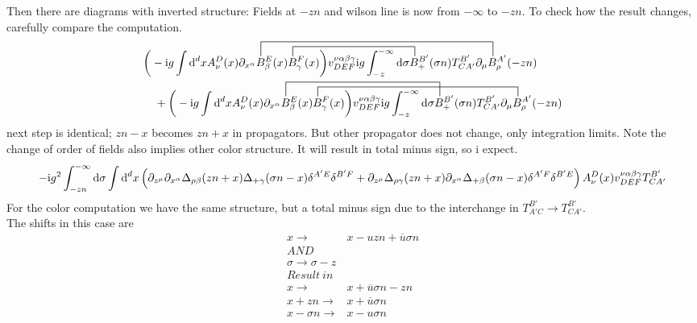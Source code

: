 Then there are diagrams with inverted structure: Fields at $-zn$ and wilson line is now from $-\infty$ to $-zn$. 
To check how the result changes, carefully compare the computation. 
\begin{align}
	&\contraction[3ex]{\bigg(-\imag g \int \ddx xA_\nu^D(x) \partial_{x^\alpha}}{B}{_\beta^{E} (x) B_\gamma^F(x) \bigg) v^{\nu \alpha\beta\gamma}_{DEF}\imag g \int_{-z}^{-\infty} \dx \sigma B_+^{B'}(\sigma n) T^{B'}_{CA'}\partial_\mu}{B}
	\contraction[2ex]{\bigg(-\imag g \int \ddx xA_\nu^D(x) \partial_{x^\alpha} B_\beta^{E} (x) }{B}{_\gamma^F(x) \bigg) v^{\nu \alpha\beta\gamma}_{DEF}\imag g \int_{-z}^{-\infty} \dx \sigma }{B}
	\bigg(-\imag g \int \ddx xA_\nu^D(x) \partial_{x^\alpha} B_\beta^{E} (x) B_\gamma^F(x) \bigg) v^{\nu \alpha\beta\gamma}_{DEF}\imag g \int_{-z}^{-\infty} \dx \sigma B_+^{B'}(\sigma n) T^{B'}_{CA'}\partial_\mu B^{A'}_\rho (-zn) 
	\nl
	+
	\contraction[3ex]{\bigg(-\imag g \int \ddx xA_\nu^D(x) \partial_{x^\alpha}}{B}{_\beta^{E} (x) B_\gamma^F(x) \bigg) v^{\nu \alpha\beta\gamma}_{DEF}\imag g \int_{-z}^{-\infty} \dx \sigma}{B}
	\contraction[2ex]{\bigg(-\imag g \int \ddx xA_\nu^D(x) \partial_{x^\alpha} B_\beta^{E} (x)}{B}{_\gamma^F(x) \bigg) v^{\nu \alpha\beta\gamma}_{DEF}\imag g \int_{-z}^{-\infty} \dx \sigma B_+^{B'}(\sigma n) T^{B'}_{CA'}\partial_\mu}{B}
	\bigg(-\imag g \int \ddx xA_\nu^D(x) \partial_{x^\alpha} B_\beta^{E} (x) B_\gamma^F(x) \bigg) v^{\nu \alpha\beta\gamma}_{DEF}\imag g \int_{-z}^{-\infty} \dx \sigma B_+^{B'}(\sigma n) T^{B'}_{CA'}\partial_\mu B^{A'}_\rho (-zn)
\end{align}
next step is identical; $zn-x$ becomes $zn+x$ in propagators. But other propagator does not change, only integration limits. Note the change of order of fields also implies other color structure. It will result in total minus sign, so i expect.
\begin{align}
-\text{i} g^2\int_{-zn}^{-\infty} \text{d} \sigma  \int \text{d} ^d x 
\left( \partial_{z^\mu} \partial_{x^\alpha} \Delta_{\rho \beta}(zn+x) \Delta_{+ \gamma}(\sigma n -x)\delta^{A'E} \delta^{B'F} + \partial_{z^\mu}  \Delta_{\rho \gamma}(zn+x) \partial_{x^\alpha}\Delta_{+ \beta}(\sigma n -x) \delta^{A'F} \delta^{B'E} \right)A_{\nu}^{D}(x)v^{\nu \alpha\beta\gamma}_{DEF} T^{B'}_{CA'}
\end{align}
For the color computation we have the same structure, but a total minus sign due to the interchange in $T^{B'}_{A'C} \rightarrow T^{B'}_{CA'}$.
\\
The shifts in this case are
\begin{align}
x\rightarrow& x - uzn + \overline u \sigma n
\\
AND
\\
\sigma\rightarrow\sigma - z
\\
Result~in 
\\
x\rightarrow& x + \overline u \sigma n -zn
\\
x+zn \rightarrow & x + \overline u \sigma n
\\
x-\sigma n \rightarrow & x - u\sigma n
\end{align}
